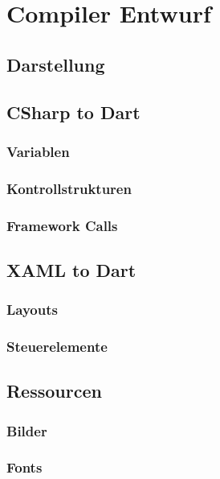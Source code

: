 \chapter{Compiler Entwurf}

\section{Darstellung}
\section{CSharp to Dart}
\subsection{Variablen}
\subsection{Kontrollstrukturen}
\subsection{Framework Calls}

\section{XAML to Dart}
\subsection{Layouts}
\subsection{Steuerelemente}

\section{Ressourcen}
\subsection{Bilder}
\subsection{Fonts}

